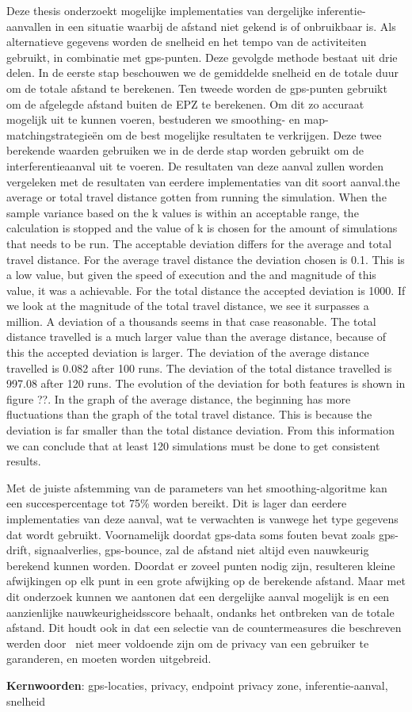 Deze thesis onderzoekt mogelijke implementaties van dergelijke
inferentie-aanvallen in een situatie waarbij de afstand niet gekend is of
onbruikbaar is. Als alternatieve gegevens worden de snelheid en het tempo van
de activiteiten gebruikt, in combinatie met gps-punten. Deze gevolgde methode
bestaat uit drie delen. In de eerste stap beschouwen we de gemiddelde snelheid
en de totale duur om de totale afstand te berekenen. Ten tweede worden de
gps-punten gebruikt om de afgelegde afstand buiten de EPZ te berekenen. Om dit
zo accuraat mogelijk uit te kunnen voeren, bestuderen we smoothing- en
map-matchingstrategieën om de best mogelijke resultaten te verkrijgen. Deze
twee berekende waarden gebruiken we in de derde stap worden gebruikt om de
interferentieaanval uit te voeren. De resultaten van deze aanval zullen worden
vergeleken met de resultaten van eerdere implementaties van dit soort
aanval.the average or total travel distance gotten from running the simulation.
When the sample variance based on the k values is within an acceptable range,
the calculation is stopped and the value of k is chosen for the amount of
simulations that needs to be run. The acceptable deviation differs for the
average and total travel distance. For the average travel distance the
deviation chosen is 0.1. This is a low value, but given the speed of execution
and the and magnitude of this value, it was a achievable. For the total
distance the accepted deviation is 1000. If we look at the magnitude of the
total travel distance, we see it surpasses a million. A deviation of a
thousands seems in that case reasonable. The total distance travelled is a much
larger value than the average distance, because of this the accepted deviation
is larger. The deviation of the average distance travelled is 0.082 after 100
runs. The deviation of the total distance travelled is 997.08 after 120 runs.
The evolution of the deviation for both features is shown in figure ??. In the
graph of the average distance, the beginning has more fluctuations than the
graph of the total travel distance. This is because the deviation is far
smaller than the total distance deviation. From this information we can
conclude that at least 120 simulations must be done to get consistent results.

Met de juiste afstemming van de parameters van het smoothing-algoritme kan een
succespercentage tot 75\% worden bereikt. Dit is lager dan eerdere
implementaties van deze aanval, wat te verwachten is vanwege het type gegevens
dat wordt gebruikt. Voornamelijk doordat gps-data soms fouten bevat zoals
gps-drift, signaalverlies, gps-bounce, zal de afstand niet altijd even
nauwkeurig berekend kunnen worden. Doordat er zoveel punten nodig zijn,
resulteren kleine afwijkingen op elk punt in een grote afwijking op de
berekende afstand. Maar met dit onderzoek kunnen we aantonen dat een dergelijke
aanval mogelijk is en een aanzienlijke nauwkeurigheidsscore behaalt, ondanks
het ontbreken van de totale afstand. Dit houdt ook in dat een selectie van de
countermeasures die beschreven werden door~\citeauthor{Dhondt} niet meer
voldoende zijn om de privacy van een gebruiker te garanderen, en moeten worden
uitgebreid.

\textbf{Kernwoorden}: gps-locaties, privacy, endpoint privacy zone,
inferentie-aanval, snelheid